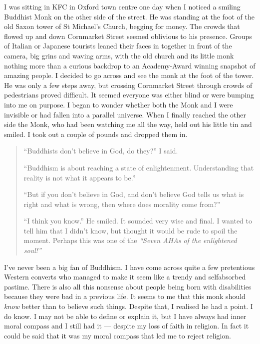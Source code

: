 \documentclass[12pt]{memoir}
\begin{document}
I was sitting in KFC in Oxford town centre one day
when I noticed a smiling Buddhist Monk on the other side of the street.
He was standing at the foot of the old Saxon tower of St Michael’s Church,
begging for money.
The crowds that flowed up and down Cornmarket Street
seemed oblivious to his presence.
Groups of Italian or Japanese tourists leaned their faces
in together in front of the camera,
big grins and waving arms,
with the old church and its little monk nothing more than a curious
backdrop to an Academy-Award winning snapshot of amazing people.
I decided to go across and see the monk at the foot of the tower.
He was only a few steps away, but crossing Cornmarket Street
through crowds of pedestrians proved difficult.
It seemed everyone was either blind or were bumping into me on purpose.
I began to wonder whether both the Monk and I were invisible
or had fallen into a parallel universe.
When I finally reached the other side the Monk,
who had been watching me all the way,
held out his little tin and smiled.
I took out a couple of pounds and dropped them in.

\begin{quote}
“Buddhists don’t believe in God, do they?” I said.

“Buddhism is about reaching a state of enlightenment.
Understanding that reality is not what it appears to be.”

“But if you don’t believe in God,
and don’t believe God tells us what is right and what is wrong,
then where does morality come from?”

“I think you know.” He smiled.
It sounded very wise and final.
I wanted to tell him that I didn’t know,
but thought it would be rude to spoil the moment.
Perhaps this was one of the \emph{“Seven AHAs of the enlightened soul!”}
\end{quote}

I’ve never been a big fan of Buddhism.
I have come across quite a few pretentious Western converts
who managed to make it seem like a trendy and self\–absorbed pastime.
There is also all this nonsense about people being born
with disabilities because they were bad in a previous life.
It seems to me that this monk should \emph{know} better
than to believe such things.
Despite that, I realised he had a point.
I do know. I may not be able to define or explain it,
but I have always had  inner moral compass and I still had it —
despite my loss of faith in religion.
In fact it could be said that it was my moral compass
that led me to reject religion.
\end{document}
